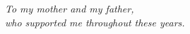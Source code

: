 \documentclass[a4paper]{book}
\theoremstyle{definition}
\theoremstyle{remark}
\begin{document}

    
    \cleardoublepage
 
    \begin{center}
		\emph{
			To my mother and my father, \\ who supported me throughout these years.
		}
    \end{center}
    \clearpage

  
    \mainmatter

    
    
          
      
%        
	
\end{document}
